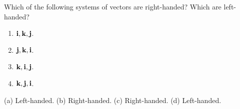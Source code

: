 \begin{ex}
  Which of the following systems of vectors are right-handed? Which
  are left-handed?
  \begin{enumerate}
  \item $\vect{i},\vect{k},\vect{j}$.
  \item $\vect{j},\vect{k},\vect{i}$.
  \item $\vect{k},\vect{i},\vect{j}$.
  \item $\vect{k},\vect{j},\vect{i}$.
  \end{enumerate}
  \begin{sol}
    (a) Left-handed.
    (b) Right-handed.
    (c) Right-handed.
    (d) Left-handed.
  \end{sol}
\end{ex}

